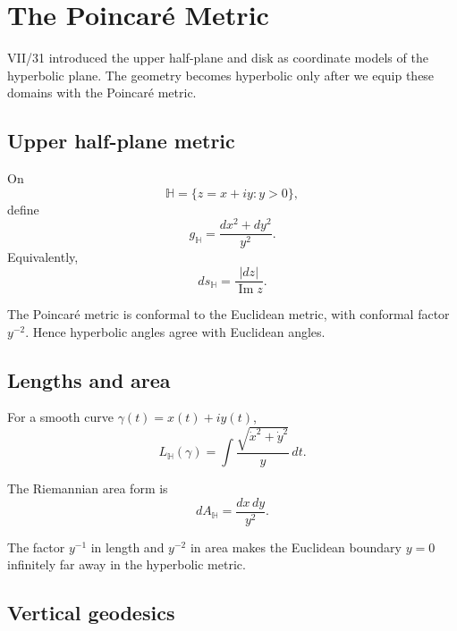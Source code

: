 \chapter{The Poincaré Metric}
\label{ch:vii32-poincare}

VII/31 introduced the upper half-plane and disk as coordinate models of the
hyperbolic plane.  The geometry becomes hyperbolic only after we equip these
domains with the Poincaré metric.

\section{Upper half-plane metric}

\begin{definition}\label{def:vii32-half-metric}
On
\[
\mathbb H=\{z=x+iy:y>0\},
\]
define
\[
g_{\mathbb H}
=
\frac{dx^2+dy^2}{y^2}.
\]
Equivalently,
\[
ds_{\mathbb H}
=
\frac{|dz|}{\operatorname{Im}z}.
\]
\end{definition}

\begin{proposition}[Conformality]\label{prop:vii32-conformal}
The Poincaré metric is conformal to the Euclidean metric, with conformal factor
\(y^{-2}\).  Hence hyperbolic angles agree with Euclidean angles.
\end{proposition}

\section{Lengths and area}

For a smooth curve \(\gamma(t)=x(t)+iy(t)\),
\[
L_{\mathbb H}(\gamma)
=
\int
\frac{\sqrt{\dot x^2+\dot y^2}}{y}\,dt.
\]

\begin{definition}\label{def:vii32-area}
The Riemannian area form is
\[
dA_{\mathbb H}
=
\frac{dx\,dy}{y^2}.
\]
\end{definition}

\begin{remark}
The factor \(y^{-1}\) in length and \(y^{-2}\) in area makes the Euclidean
boundary \(y=0\) infinitely far away in the hyperbolic metric.
\end{remark}

\section{Vertical geodesics}

